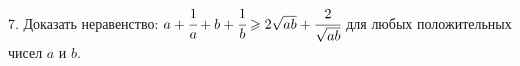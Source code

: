 7. Доказать неравенство: $a+\cfrac{1}{a}+b+\cfrac{1}{b}\geqslant2\sqrt{ab}+\cfrac{2}{\sqrt{ab}}$ для любых положительных чисел $a$ и $b.$\\
